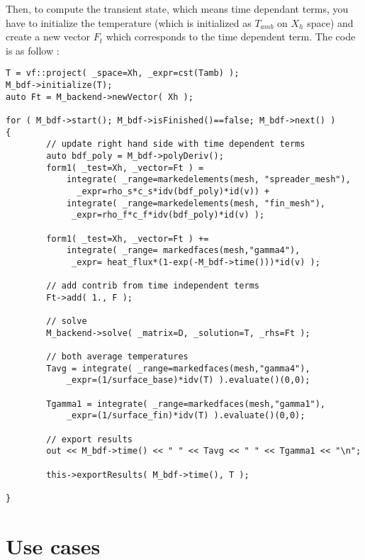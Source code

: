 Then, to compute the transient state, which means time dependant terms, you have to initialize the temperature (which is initialized as $T_{amb}$ on $X_h$ space) and create a new vector  $F_t$ which corresponds to the time dependent term. The code is as follow :
\begin{lstlisting}
T = vf::project( _space=Xh, _expr=cst(Tamb) );
M_bdf->initialize(T);
auto Ft = M_backend->newVector( Xh );

for ( M_bdf->start(); M_bdf->isFinished()==false; M_bdf->next() )
{
        // update right hand side with time dependent terms                                                                                              
        auto bdf_poly = M_bdf->polyDeriv();
        form1( _test=Xh, _vector=Ft ) =
            integrate( _range=markedelements(mesh, "spreader_mesh"), 
			  _expr=rho_s*c_s*idv(bdf_poly)*id(v)) +
            integrate( _range=markedelements(mesh, "fin_mesh"), 
			 _expr=rho_f*c_f*idv(bdf_poly)*id(v) );
			
        form1( _test=Xh, _vector=Ft ) +=
            integrate( _range= markedfaces(mesh,"gamma4"),
			 _expr= heat_flux*(1-exp(-M_bdf->time()))*id(v) );

        // add contrib from time independent terms                                                                                                       
        Ft->add( 1., F );

        // solve 
        M_backend->solve( _matrix=D, _solution=T, _rhs=Ft );

        // both average temperatures
        Tavg = integrate( _range=markedfaces(mesh,"gamma4"), 
			_expr=(1/surface_base)*idv(T) ).evaluate()(0,0);
				
        Tgamma1 = integrate( _range=markedfaces(mesh,"gamma1"), 
			_expr=(1/surface_fin)*idv(T) ).evaluate()(0,0);

        // export results                                                                                                                                
        out << M_bdf->time() << " " << Tavg << " " << Tgamma1 << "\n";

        this->exportResults( M_bdf->time(), T );

}
\end{lstlisting}



\section{Use cases}
